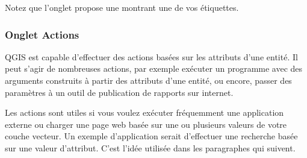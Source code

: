 Notez que l'onglet  propose une  montrant une de vos \'etiquettes.

\subsubsection{Onglet Actions}\label{label_actions}

QGIS est capable d'effectuer des actions bas\'ees sur les attributs d'une entit\'e. Il peut s'agir de nombreuses actions, par exemple ex\'ecuter un programme avec des arguments construits \`a partir des attributs d'une entit\'e, ou encore, passer des param\`etres \`a un outil de publication de rapports sur internet.

Les actions sont utiles si vous voulez ex\'ecuter fr\'equemment une application externe ou charger une page web bas\'ee sur une ou plusieurs valeurs de votre couche vecteur. Un exemple d'application serait d'effectuer une recherche bas\'ee sur une valeur d'attribut. C'est l'id\'ee utilis\'ee dans les paragraphes qui suivent.


